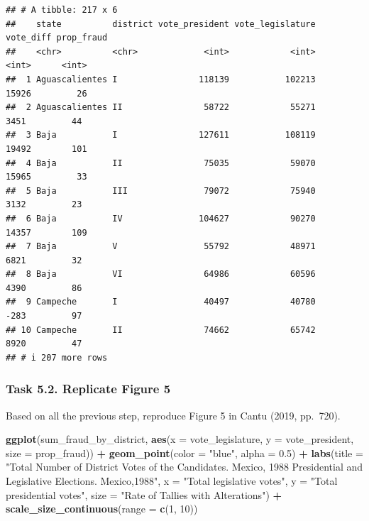 \documentclass[
]{article}
\newenvironment{Shaded}{\begin{snugshade}}{\end{snugshade}}
\newcommand{\AttributeTok}[1]{\textcolor[rgb]{0.13,0.29,0.53}{#1}}
\newcommand{\DecValTok}[1]{\textcolor[rgb]{0.00,0.00,0.81}{#1}}
\newcommand{\FloatTok}[1]{\textcolor[rgb]{0.00,0.00,0.81}{#1}}
\newcommand{\FunctionTok}[1]{\textcolor[rgb]{0.13,0.29,0.53}{\textbf{#1}}}
\newcommand{\NormalTok}[1]{#1}
\newcommand{\SpecialCharTok}[1]{\textcolor[rgb]{0.81,0.36,0.00}{\textbf{#1}}}
\newcommand{\StringTok}[1]{\textcolor[rgb]{0.31,0.60,0.02}{#1}}
\begin{document}
\begin{verbatim}
## # A tibble: 217 x 6
##    state          district vote_president vote_legislature vote_diff prop_fraud
##    <chr>          <chr>             <int>            <int>     <int>      <int>
##  1 Aguascalientes I                118139           102213     15926         26
##  2 Aguascalientes II                58722            55271      3451         44
##  3 Baja           I                127611           108119     19492        101
##  4 Baja           II                75035            59070     15965         33
##  5 Baja           III               79072            75940      3132         23
##  6 Baja           IV               104627            90270     14357        109
##  7 Baja           V                 55792            48971      6821         32
##  8 Baja           VI                64986            60596      4390         86
##  9 Campeche       I                 40497            40780      -283         97
## 10 Campeche       II                74662            65742      8920         47
## # i 207 more rows
\end{verbatim}

\clearpage

\hypertarget{task-5.2.-replicate-figure-5}{%
\subsubsection{Task 5.2. Replicate Figure
5}\label{task-5.2.-replicate-figure-5}}

Based on all the previous step, reproduce Figure 5 in Cantu (2019,
pp.~720).

\begin{Shaded}
\begin{Highlighting}[]
\FunctionTok{ggplot}\NormalTok{(sum\_fraud\_by\_district, }\FunctionTok{aes}\NormalTok{(}\AttributeTok{x =}\NormalTok{ vote\_legislature, }\AttributeTok{y =}\NormalTok{ vote\_president, }\AttributeTok{size =}\NormalTok{ prop\_fraud)) }\SpecialCharTok{+}
  \FunctionTok{geom\_point}\NormalTok{(}\AttributeTok{color =} \StringTok{"blue"}\NormalTok{, }\AttributeTok{alpha =} \FloatTok{0.5}\NormalTok{) }\SpecialCharTok{+}
  \FunctionTok{labs}\NormalTok{(}\AttributeTok{title =} \StringTok{"Total Number of District Votes}
\StringTok{of the Candidates. }
\StringTok{Mexico, 1988 Presidential and Legislative Elections. Mexico,1988"}\NormalTok{,}
       \AttributeTok{x =} \StringTok{"Total legislative votes"}\NormalTok{,}
       \AttributeTok{y =} \StringTok{"Total presidential votes"}\NormalTok{,}
       \AttributeTok{size =} \StringTok{"Rate of Tallies with Alterations"}\NormalTok{) }\SpecialCharTok{+}
  \FunctionTok{scale\_size\_continuous}\NormalTok{(}\AttributeTok{range =} \FunctionTok{c}\NormalTok{(}\DecValTok{1}\NormalTok{, }\DecValTok{10}\NormalTok{))}
\end{Highlighting}
\end{Shaded}
\end{document}
